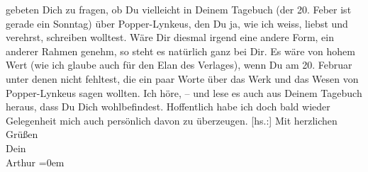 \begin{ledgroupsized}[t]{13cm}
               gebeten Dich zu fragen, ob Du vielleicht in Deinem Tagebuch (der 20.
                  Feber ist gerade ein Sonntag) über Popper-Lynkeus, den Du ja, wie ich weiss, liebst und verehrst, schreiben
               wolltest. Wäre Dir diesmal irgend eine andere Form, ein anderer Rahmen genehm, so
               steht es natürlich ganz bei Dir. Es wäre von hohem Wert (wie ich glaube auch für den
               Elan des Verlages), wenn Du am 20. Februar unter denen nicht fehltest,
               die ein paar Worte über das Werk und das Wesen von Popper-Lynkeus sagen wollten.\pend
           \pstart
           Ich höre\introOben{}, –\introOben{} und lese es auch aus Deinem Tagebuch heraus, dass Du Dich wohlbefindest. Hoffentlich habe ich
               doch bald wieder Gelegenheit mich auch persönlich davon zu überzeugen.\pend
           \pstart
           {[}hs.:{]} Mit herzlichen Grüßen{\\[\baselineskip]}Dein{\\[\baselineskip]}\spacefill\mbox{Arthur}\pend
           \leftskip=0em{}
         
         \endnumbering{}\end{ledgroupsized}  \newcommand{\dateiname}{L02360}\newcommand{\titel}{Arthur Schnitzler an Hermann Bahr, 7. 2. 1921}\newcommand{\editorInnen}{ Kurt Ifkovits,  Martin Anton Müller}
      